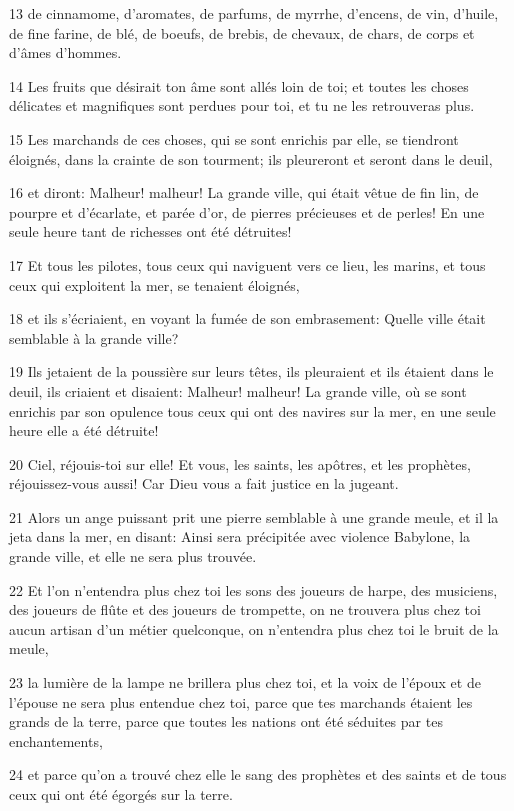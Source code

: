 \par 13 de cinnamome, d'aromates, de parfums, de myrrhe, d'encens, de vin, d'huile, de fine farine, de blé, de boeufs, de brebis, de chevaux, de chars, de corps et d'âmes d'hommes.
\par 14 Les fruits que désirait ton âme sont allés loin de toi; et toutes les choses délicates et magnifiques sont perdues pour toi, et tu ne les retrouveras plus.
\par 15 Les marchands de ces choses, qui se sont enrichis par elle, se tiendront éloignés, dans la crainte de son tourment; ils pleureront et seront dans le deuil,
\par 16 et diront: Malheur! malheur! La grande ville, qui était vêtue de fin lin, de pourpre et d'écarlate, et parée d'or, de pierres précieuses et de perles! En une seule heure tant de richesses ont été détruites!
\par 17 Et tous les pilotes, tous ceux qui naviguent vers ce lieu, les marins, et tous ceux qui exploitent la mer, se tenaient éloignés,
\par 18 et ils s'écriaient, en voyant la fumée de son embrasement: Quelle ville était semblable à la grande ville?
\par 19 Ils jetaient de la poussière sur leurs têtes, ils pleuraient et ils étaient dans le deuil, ils criaient et disaient: Malheur! malheur! La grande ville, où se sont enrichis par son opulence tous ceux qui ont des navires sur la mer, en une seule heure elle a été détruite!
\par 20 Ciel, réjouis-toi sur elle! Et vous, les saints, les apôtres, et les prophètes, réjouissez-vous aussi! Car Dieu vous a fait justice en la jugeant.
\par 21 Alors un ange puissant prit une pierre semblable à une grande meule, et il la jeta dans la mer, en disant: Ainsi sera précipitée avec violence Babylone, la grande ville, et elle ne sera plus trouvée.
\par 22 Et l'on n'entendra plus chez toi les sons des joueurs de harpe, des musiciens, des joueurs de flûte et des joueurs de trompette, on ne trouvera plus chez toi aucun artisan d'un métier quelconque, on n'entendra plus chez toi le bruit de la meule,
\par 23 la lumière de la lampe ne brillera plus chez toi, et la voix de l'époux et de l'épouse ne sera plus entendue chez toi, parce que tes marchands étaient les grands de la terre, parce que toutes les nations ont été séduites par tes enchantements,
\par 24 et parce qu'on a trouvé chez elle le sang des prophètes et des saints et de tous ceux qui ont été égorgés sur la terre.

